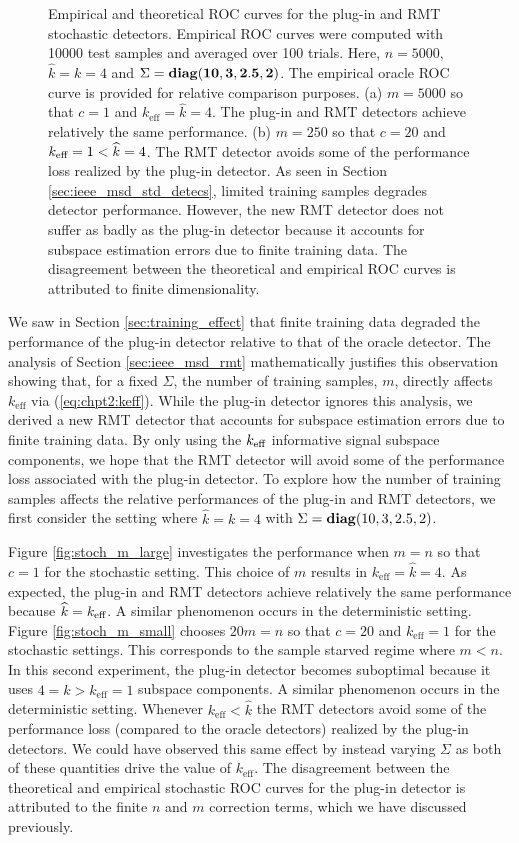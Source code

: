 \begin{figure}
\caption{Empirical and theoretical ROC curves for the plug-in and RMT stochastic detectors. Empirical ROC curves were computed with 10000 test samples and averaged over 100 trials. Here, $n=5000$, $\widehat{k}=k=4$ and $\Sigma = \mathop{\bf diag}({\bf{10,3,2.5,2}})$. The empirical oracle ROC curve is provided for relative comparison purposes. (a) $m=5000$ so that $c=1$ and $k_\text{eff}=\widehat{k}=4$. The plug-in and RMT detectors achieve relatively the same performance. (b) $m=250$ so that $c=20$ and $k_\text{eff}=1<\widehat{k}=4$. The RMT detector avoids some of the performance loss realized by the plug-in detector. As seen in Section \ref{sec:ieee_msd_std_detecs}, limited training samples degrades detector performance. However, the new RMT detector does not suffer as badly as the plug-in detector because it accounts for subspace estimation errors due to finite training data. The disagreement between the theoretical and empirical ROC curves is attributed to finite dimensionality.}
\label{fig:stoch_m_effect}
\vspace{-0.3in}
\end{figure}

We saw in Section \ref{sec:training_effect} that finite training data degraded the performance of the plug-in detector relative to that of the oracle detector. The analysis of Section \ref{sec:ieee_msd_rmt} mathematically justifies this observation showing that, for a fixed $\Sigma$, the number of training samples, $m$, directly affects $k_\text{eff}$ via (\ref{eq:chpt2:keff}). While the plug-in detector ignores this analysis, we derived a new RMT detector that accounts for subspace estimation errors due to finite training data. By only using the $k_\text{eff}$ informative signal subspace components, we hope that the RMT detector will avoid some of the performance loss associated with the plug-in detector. To explore how the number of training samples affects the relative performances of the plug-in and RMT detectors, we first consider the setting where $\widehat{k}=k=4$ with $\Sigma=\mathop{\bf diag}(10,3,2.5,2)$. 

Figure \ref{fig:stoch_m_large} investigates the performance when $m=n$ so that $c=1$ for
the stochastic setting.  This
choice of $m$ results in $k_\text{eff}=\widehat{k}=4$. As expected, the plug-in and RMT
detectors achieve relatively the same performance because $\widehat{k}=k_\text{eff}$. A similar
phenomenon occurs in the deterministic setting. Figure
\ref{fig:stoch_m_small} chooses $20m=n$ so that $c=20$ and $k_\text{eff}=1$ for the
stochastic settings. This corresponds to the sample starved regime where $m<n$. In this
second experiment, the plug-in detector becomes suboptimal because it uses $4=\widehat{k}
> k_\text{eff}=1$ subspace components. A similar phenomenon occurs in the deterministic
setting. Whenever $k_\text{eff}<\widehat{k}$ the RMT detectors avoid some of the performance loss (compared to the oracle detectors) realized by the plug-in detectors. We could have observed this same effect by instead varying $\Sigma$ as both of these quantities drive the value of $k_\text{eff}$. The disagreement between the theoretical and empirical stochastic ROC curves for the plug-in detector is attributed to the finite $n$ and $m$ correction terms, which we have discussed previously.


